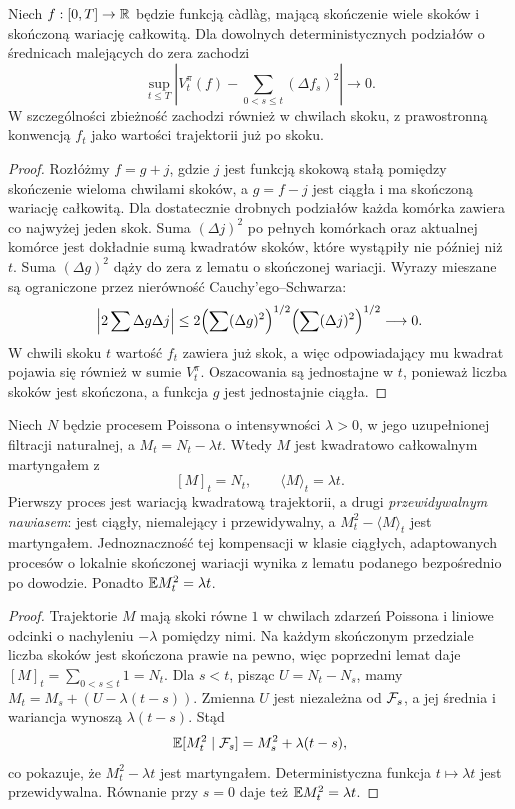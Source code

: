 \begin{lemat}
Niech $f:[0,T]\to\mathbb{R}$ będzie funkcją c\`adl\`ag,
mającą skończenie wiele skoków i skończoną wariację
całkowitą. Dla dowolnych deterministycznych podziałów
o średnicach malejących do zera zachodzi
\[
\sup_{t\le T}\left|V_t^\pi(f)-
\sum_{0<s\le t}(\Delta f_s)^2\right|\longrightarrow0.
\]
W szczególności zbieżność zachodzi również w chwilach
skoku, z prawostronną konwencją $f_t$ jako wartości
trajektorii już po skoku.
\end{lemat}
\begin{proof}
Rozłóżmy $f=g+j$, gdzie $j$ jest funkcją skokową
stałą pomiędzy skończenie wieloma chwilami skoków,
a $g=f-j$ jest ciągła i ma skończoną wariację
całkowitą. Dla dostatecznie drobnych podziałów
każda komórka zawiera co najwyżej jeden skok.
Suma $(\Delta j)^2$ po pełnych komórkach oraz
aktualnej komórce jest dokładnie sumą kwadratów
skoków, które wystąpiły nie później niż $t$. Suma $(\Delta g)^2$ dąży do zera
z lematu o skończonej wariacji. Wyrazy mieszane są
ograniczone przez nierówność Cauchy'ego--Schwarza:
\[
\left|2\sum\Delta g\Delta j\right|
\le2\Bigl(\sum(\Delta g)^2\Bigr)^{1/2}
\Bigl(\sum(\Delta j)^2\Bigr)^{1/2}\longrightarrow0.
\]
W chwili skoku $t$ wartość $f_t$ zawiera już skok,
a więc odpowiadający mu kwadrat pojawia się również
w sumie $V_t^\pi$. Oszacowania są jednostajne w $t$,
ponieważ liczba skoków jest skończona, a funkcja $g$
jest jednostajnie ciągła.
\end{proof}

\begin{twierdzenie}
Niech $N$ będzie procesem Poissona o intensywności
$\lambda>0$, w jego uzupełnionej filtracji naturalnej,
a $M_t=N_t-\lambda t$. Wtedy $M$ jest kwadratowo
całkowalnym martyngałem z
\[
[M]_t=N_t,\qquad \langle M\rangle_t=\lambda t.
\]
Pierwszy proces jest wariacją kwadratową trajektorii,
a drugi \emph{przewidywalnym nawiasem}: jest ciągły,
niemalejący i przewidywalny, a $M_t^2-\langle M\rangle_t$
jest martyngałem. Jednoznaczność tej kompensacji w klasie ciągłych,
adaptowanych procesów o lokalnie skończonej wariacji
wynika z lematu podanego bezpośrednio po dowodzie.
Ponadto $\mathbb{E} M_t^2=\lambda t$.
\end{twierdzenie}
\begin{proof}
Trajektorie $M$ mają skoki równe $1$ w chwilach
zdarzeń Poissona i liniowe odcinki o nachyleniu
$-\lambda$ pomiędzy nimi. Na każdym skończonym
przedziale liczba skoków jest skończona prawie na pewno,
więc poprzedni lemat daje
$[M]_t=\sum_{0<s\le t}1=N_t$.
Dla $s<t$, pisząc $U=N_t-N_s$, mamy
$M_t=M_s+(U-\lambda(t-s))$.
Zmienna $U$ jest niezależna od $\mathcal{F}_s$, a jej
średnia i wariancja wynoszą $\lambda(t-s)$.
Stąd
\[
\mathbb{E}[M_t^2\mid\mathcal{F}_s]
=M_s^2+\lambda(t-s),
\]
co pokazuje, że $M_t^2-\lambda t$ jest martyngałem.
Deterministyczna funkcja $t\mapsto\lambda t$ jest
przewidywalna. Równanie przy $s=0$ daje też
$\mathbb{E} M_t^2=\lambda t$.
\end{proof}


